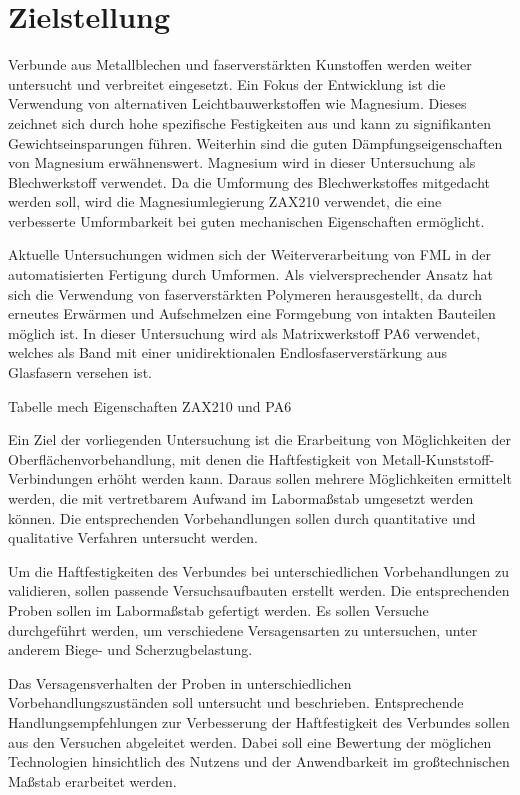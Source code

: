\chapter{Zielstellung}\label{cha:ziel}


Verbunde aus Metallblechen und faserverstärkten Kunstoffen werden weiter untersucht und verbreitet eingesetzt. Ein Fokus der Entwicklung ist die Verwendung von alternativen Leichtbauwerkstoffen wie Magnesium. Dieses zeichnet sich durch hohe spezifische Festigkeiten aus und kann zu signifikanten Gewichtseinsparungen führen.  Weiterhin sind die guten Dämpfungseigenschaften von Magnesium erwähnenswert. 
Magnesium wird in dieser Untersuchung als Blechwerkstoff verwendet. Da die Umformung des Blechwerkstoffes mitgedacht werden soll, wird die Magnesiumlegierung ZAX210 verwendet, die eine verbesserte Umformbarkeit bei guten mechanischen Eigenschaften ermöglicht. 

Aktuelle Untersuchungen widmen sich der Weiterverarbeitung von FML in der automatisierten Fertigung durch Umformen. Als vielversprechender Ansatz hat sich die Verwendung von faserverstärkten Polymeren herausgestellt, da durch erneutes Erwärmen und Aufschmelzen eine Formgebung von intakten Bauteilen möglich ist. In dieser Untersuchung wird als Matrixwerkstoff PA6 verwendet, welches als Band mit einer unidirektionalen Endlosfaserverstärkung aus Glasfasern versehen ist.

Tabelle mech Eigenschaften ZAX210 und PA6

Ein Ziel der vorliegenden Untersuchung ist die Erarbeitung von Möglichkeiten der Oberflächenvorbehandlung, mit denen die Haftfestigkeit von Metall-Kunststoff-Verbindungen erhöht werden kann. Daraus sollen mehrere Möglichkeiten ermittelt werden, die mit vertretbarem Aufwand im Labormaßstab umgesetzt werden können. Die entsprechenden Vorbehandlungen sollen durch quantitative und qualitative Verfahren untersucht werden. 

Um die Haftfestigkeiten des Verbundes bei unterschiedlichen Vorbehandlungen zu validieren, sollen passende Versuchsaufbauten erstellt werden. Die entsprechenden Proben sollen im Labormaßstab gefertigt werden. Es sollen Versuche durchgeführt werden, um verschiedene Versagensarten zu untersuchen, unter anderem Biege- und Scherzugbelastung.

Das Versagensverhalten der Proben in unterschiedlichen Vorbehandlungszuständen soll untersucht und beschrieben. Entsprechende Handlungsempfehlungen zur Verbesserung der Haftfestigkeit des Verbundes sollen aus den Versuchen abgeleitet werden. Dabei soll eine Bewertung der möglichen Technologien hinsichtlich des Nutzens und der Anwendbarkeit im großtechnischen Maßstab erarbeitet werden.